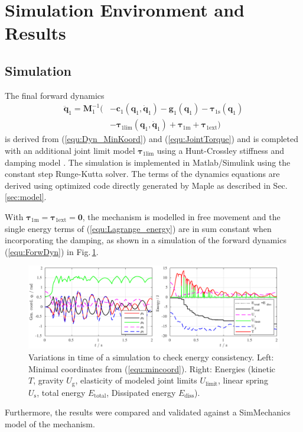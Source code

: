 \documentclass[twocolumn,10pt]{IFTOMM}
\newcommand{\bm}[1]{\boldsymbol{#1}}
\begin{document}
\section{Simulation Environment and Results}
\label{sec:simulation}

\subsection{Simulation}

The final forward dynamics
\begin{align}
\ddot{\bm{q}}_1 = \bm{M}_1^{-1}( &-\bm{c}_1(\bm{q}_1,\dot{\bm{q}}_1)-\bm{g}_1(\bm{q}_1) -\bm{\tau}_{1\mathrm{s}}(\bm{q}_1) \nonumber \\
& - \bm{\tau}_{1\mathrm{lim}}(\bm{q}_1,\dot{\bm{q}}_1)  + \bm{\tau}_{1\mathrm{m}} + \bm{\tau}_{1\mathrm{ext}})
\label{equ:ForwDyn}
\end{align}
is derived from (\ref{equ:Dyn_MinKoord}) and (\ref{equ:JointTorque}) and is completed with an additional joint limit model $\bm{\tau}_{1\mathrm{lim}}$ using a Hunt-Crossley stiffness and damping model \cite{AzadFea2010}.
The simulation is implemented in Matlab/Simulink using the constant step Runge-Kutta solver.
The terms of the dynamics equations are derived using optimized code directly generated by Maple as described in Sec.\,\ref{sec:model}.

With ${\bm{\tau}_{1\mathrm{m}} = \bm{\tau}_{1\mathrm{ext}} = \bm{0}}$, the mechanism is modelled in free movement and the single energy terms of (\ref{equ:Lagrange_energy}) are in sum constant when incorporating the damping, as shown in a simulation of the forward dynamics (\ref{equ:ForwDyn}) in Fig.\,\ref{fig:SimulationEnergiekonsistenz}.
%
\begin{figure}[htb!]
    \includegraphics{figures/KAS5m5_Gelenkgrenzmodell_q_E.pdf} 
    \vspace{-0.4cm}
    \caption{Variations in time of a simulation to check energy consistency. Left: Minimal coordinates from (\ref{equ:mincoord}). Right: Energies (kinetic $T$, gravity $U_{\mathrm{g}}$, elasticity of modeled joint limits $U_{\mathrm{limit}}$, linear spring $U_{\mathrm{s}}$, total energy $E_{\mathrm{total}}$, Dissipated energy $E_{\mathrm{diss}}$).}
    \label{fig:SimulationEnergiekonsistenz}
    \vspace{-0.2cm}
\end{figure}
%
Furthermore, the results were compared and validated against a SimMechanics model of the mechanism.
\end{document}
